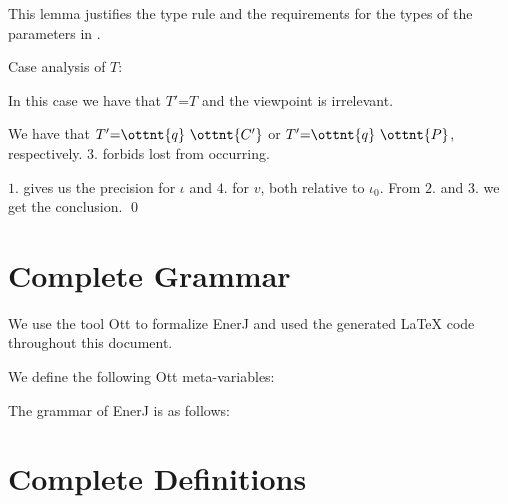 \noindent
This lemma justifies the type rule  and the
requirements for the types of the parameters in
.


Case analysis of $T$:


In this case we have that $T'  \textsf{=}  T$ and the viewpoint is
irrelevant.



We have that $T'  \textsf{=}    \ottnt{q} \  \ottnt{C'}  $ or $T'  \textsf{=}    \ottnt{q} \  \ottnt{P}  $, respectively.
$3.$ forbids lost from occurring.

$1.$ gives us the precision for $\iota$ and $4.$ for $v$, both
relative to $\iota_{{\mathrm{0}}}$.
From $2.$ and $3.$ we get the conclusion.
\qed


\newpage
\section{Complete Grammar}
\label{app:grammar}

We use the tool Ott %
to formalize EnerJ and
used the generated \LaTeX{} code throughout this document.

\medskip

\noindent
We define the following Ott meta-variables:

\medskip

\ottmetavars

\bigskip

\noindent
The grammar of EnerJ is as follows:

\medskip

\ottgrammar


\section{Complete Definitions}
\label{app:defns}

\ottdefnss
